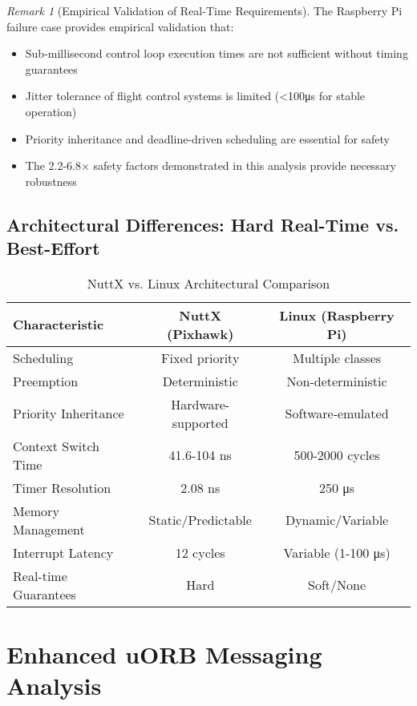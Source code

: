 \documentclass[11pt,a4paper]{article}
\theoremstyle{definition}
\theoremstyle{remark}
\newtheorem{remark}[theorem]{Remark}
\begin{document}
\begin{remark}[Empirical Validation of Real-Time Requirements]
The Raspberry Pi failure case provides empirical validation that:
\begin{itemize}
\item Sub-millisecond control loop execution times are not sufficient without timing guarantees
\item Jitter tolerance of flight control systems is limited (<100μs for stable operation)
\item Priority inheritance and deadline-driven scheduling are essential for safety
\item The 2.2-6.8× safety factors demonstrated in this analysis provide necessary robustness
\end{itemize}
\end{remark}

\subsection{Architectural Differences: Hard Real-Time vs. Best-Effort}

\begin{table}[h]
\centering
\caption{NuttX vs. Linux Architectural Comparison}
\label{tab:nuttx_linux_comparison}
\begin{tabular}{lcc}
\toprule
\textbf{Characteristic} & \textbf{NuttX (Pixhawk)} & \textbf{Linux (Raspberry Pi)} \\
\midrule
Scheduling & Fixed priority & Multiple classes \\
Preemption & Deterministic & Non-deterministic \\
Priority Inheritance & Hardware-supported & Software-emulated \\
Context Switch Time & 41.6-104 ns & 500-2000 cycles \\
Timer Resolution & 2.08 ns & 250 μs \\
Memory Management & Static/Predictable & Dynamic/Variable \\
Interrupt Latency & 12 cycles & Variable (1-100 μs) \\
Real-time Guarantees & Hard & Soft/None \\
\bottomrule
\end{tabular}
\end{table}

\section{Enhanced uORB Messaging Analysis}
\end{document}
